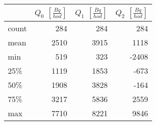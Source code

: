 \begin{tabular}{lrrr}
\toprule
{} &  $Q_0$ $\left[\si{\frac{Bq}{hod}}\right]$ &  $Q_1$ $\left[\si{\frac{Bq}{hod}}\right]$ &  $Q_2$ $\left[\si{\frac{Bq}{hod}}\right]$ \\
\midrule
count &                                       284 &                                       284 &                                       284 \\
mean  &                                      2510 &                                      3915 &                                      1118 \\
min   &                                       519 &                                       323 &                                     -2408 \\
25\%   &                                      1119 &                                      1853 &                                      -673 \\
50\%   &                                      1908 &                                      3828 &                                      -164 \\
75\%   &                                      3217 &                                      5836 &                                      2559 \\
max   &                                      7710 &                                      8221 &                                      9846 \\
\bottomrule
\end{tabular}
